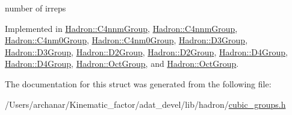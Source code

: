 number of irreps 

Implemented in \mbox{\hyperlink{structHadron_1_1C4nnmGroup_a70b7d429c62a7f1b2ed77cbc3566ea42}{Hadron\+::\+C4nnm\+Group}}, \mbox{\hyperlink{structHadron_1_1C4nnmGroup_a70b7d429c62a7f1b2ed77cbc3566ea42}{Hadron\+::\+C4nnm\+Group}}, \mbox{\hyperlink{structHadron_1_1C4nm0Group_ac77e1943ad8fa5f9211d31dc34ee3f6c}{Hadron\+::\+C4nm0\+Group}}, \mbox{\hyperlink{structHadron_1_1C4nm0Group_ac77e1943ad8fa5f9211d31dc34ee3f6c}{Hadron\+::\+C4nm0\+Group}}, \mbox{\hyperlink{structHadron_1_1D3Group_a33e3822d1ec56e4928e5bc47b655f69f}{Hadron\+::\+D3\+Group}}, \mbox{\hyperlink{structHadron_1_1D3Group_a33e3822d1ec56e4928e5bc47b655f69f}{Hadron\+::\+D3\+Group}}, \mbox{\hyperlink{structHadron_1_1D2Group_a24644ff5f0fc06adeb26457c9ce772a5}{Hadron\+::\+D2\+Group}}, \mbox{\hyperlink{structHadron_1_1D2Group_a24644ff5f0fc06adeb26457c9ce772a5}{Hadron\+::\+D2\+Group}}, \mbox{\hyperlink{structHadron_1_1D4Group_ae8b007038fb1aa79a7267feebf356d4c}{Hadron\+::\+D4\+Group}}, \mbox{\hyperlink{structHadron_1_1D4Group_ae8b007038fb1aa79a7267feebf356d4c}{Hadron\+::\+D4\+Group}}, \mbox{\hyperlink{structHadron_1_1OctGroup_aed56aa6c4ed7e2a82048b478c916b9d2}{Hadron\+::\+Oct\+Group}}, and \mbox{\hyperlink{structHadron_1_1OctGroup_aed56aa6c4ed7e2a82048b478c916b9d2}{Hadron\+::\+Oct\+Group}}.



The documentation for this struct was generated from the following file\+:\begin{DoxyCompactItemize}
\item 
/\+Users/archanar/\+Kinematic\+\_\+factor/adat\+\_\+devel/lib/hadron/\mbox{\hyperlink{lib_2hadron_2cubic__groups_8h}{cubic\+\_\+groups.\+h}}\end{DoxyCompactItemize}
